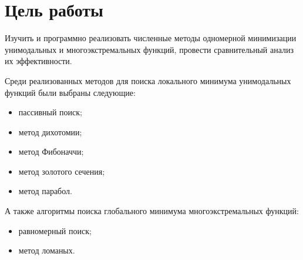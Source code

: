 \section{Цель работы}

Изучить и программно реализовать численные методы одномерной минимизации унимодальных и
многоэкстремальных функций, провести сравнительный анализ их эффективности.

Среди реализованных методов для поиска локального минимума унимодальных функций
были выбраны следующие:
\begin{itemize}
    \item пассивный поиск;
    \item метод дихотомии;
    \item метод Фибоначчи;
    \item метод золотого сечения;
    \item метод парабол.
\end{itemize}

А также алгоритмы поиска глобального минимума многоэкстремальных функций:
\begin{itemize}
    \item равномерный поиск;
    \item метод ломаных.
\end{itemize}
